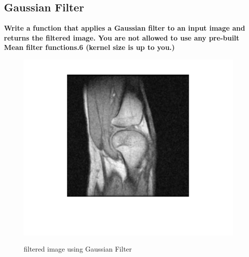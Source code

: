 \documentclass[11pt]{article}
\begin{document}
\subsection{Gaussian Filter}
\textbf{Write a function that applies a Gaussian filter to an input image and returns the filtered
image. You are not allowed to use any pre-built Mean filter functions.6 (kernel size is up to
you.)} \\

\begin{figure}[H]
    \begin{center}
        \includegraphics[scale=0.6]{Fig/gaussian.knee.png}
        \label{fig:GaussianKnee}
        \caption{filtered image using Gaussian Filter}
    \end{center}
\end{figure}
\end{document}
